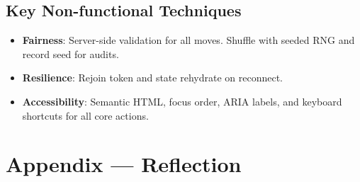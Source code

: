 \documentclass[12pt]{article}
\begin{document}
\subsection{Key Non-functional Techniques}
\begin{itemize}
  \item \textbf{Fairness}: Server-side validation for all moves. Shuffle with seeded RNG and record seed for audits.
  \item \textbf{Resilience}: Rejoin token and state rehydrate on reconnect.
  \item \textbf{Accessibility}: Semantic HTML, focus order, ARIA labels, and keyboard shortcuts for all core actions.
\end{itemize}

\newpage{}
\section*{Appendix --- Reflection}




\end{document}
